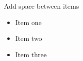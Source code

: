 
\begin{frame}{Add space between items}
    \begin{itemize}
        \item Item one
        \vspace{0.5cm}
        \item Item two
        \vspace{1cm}
        \item Item three
    \end{itemize}
\end{frame}
